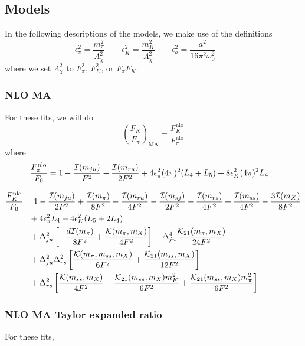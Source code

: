\documentclass[prd,tightenlines,preprintnumbers,showpacs,superscriptaddress,notitlepage,nofootinbib,eqsecnum,floatfix,notitlepage]{revtex4-1}
\begin{document}
\subsection{Models}
In the following descriptions of the models, we make use of the definitions
\begin{equation}
\epsilon_\pi^2 = \frac{m_\pi^2}{\Lambda_\chi^2} \qquad
\epsilon_K^2 = \frac{m_K^2}{\Lambda_\chi^2} \qquad
\epsilon_a^2 = \frac{a^2}{16 \pi ^2\omega_0^2} \qquad
\end{equation}
where we set $\Lambda_\chi^2$ to $F_\pi^2$, $F_K^2$, or $F_\pi F_K$.

\subsubsection{NLO MA}
For these fits, we will do
\begin{equation}
\left(\frac{F_K}{F_\pi}\right)_\text{MA} = \frac{F_K^\text{nlo}}{F_\pi^\text{nlo}}
\end{equation}
where
\begin{align}
\frac{F_\pi^{\rm nlo}}{F_0} &= 1
- \frac{\mathcal{I}(m_{ju})}{F^2}
-\frac{\mathcal{I}(m_{ru})}{2F^2}
+4 \epsilon_\pi^2 (4\pi)^2 (L_4 + L_5)
+8 \epsilon_K^2 (4\pi)^2 L_4
\end{align}

\begin{align}
\frac{F_K^{\rm nlo}}{F_0} &= 1
-\frac{\mathcal{I}(m_{ju})}{2F^2}
+\frac{\mathcal{I}(m_\pi)}{8F^2}
-\frac{\mathcal{I}(m_{ru})}{4F^2}
-\frac{\mathcal{I}(m_{sj})}{2F^2}
-\frac{\mathcal{I}(m_{rs})}{4F^2}
+\frac{\mathcal{I}(m_{ss})}{4F^2}
-\frac{3\mathcal{I}(m_X)}{8F^2}
\nonumber\\&\phantom{=}
+4\epsilon_\pi^2 L_4 + 4\epsilon_K^2(L_5 + 2L_4)
\nonumber\\&\phantom{=}
+\Delta_{ju}^2 \left[ -\frac{d\mathcal{I}(m_\pi)}{8F^2} + \frac{\mathcal{K(}m_\pi,m_X)}{4F^2} \right]
-\Delta_{ju}^4 \frac{\mathcal{K}_{21}(m_\pi,m_X)}{24 F^2}
\nonumber\\&\phantom{=}
+\Delta_{ju}^2\Delta_{rs}^2 \left[ \frac{\mathcal{K}(m_\pi, m_{ss}, m_X)}{6F^2}
+\frac{\mathcal{K}_{21}(m_{ss},m_X)}{12F^2} \right]
\nonumber\\&\phantom{=}
+\Delta_{rs}^2 \left[
\frac{\mathcal{K}(m_{ss},m_X)}{4F^2} 
-\frac{\mathcal{K}_{21}(m_{ss},m_X) m_K^2}{6F^2}
+\frac{\mathcal{K}_{21}(m_{ss},m_X) m_\pi^2}{6F^2}
\right]
\end{align}


\subsubsection{NLO MA Taylor expanded ratio}
For these fits, 
\end{document}
